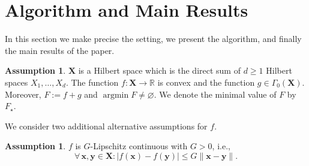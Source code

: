 \documentclass[11pt]{article}
\theoremstyle{plain}
\theoremstyle{definition}
\newtheorem{assumption}[theorem]{Assumption}
\theoremstyle{remark}
\newcommand{\norm}[1]{\lVert{#1}\rVert}
\newcommand{\abs}[1]{\lvert{#1}\rvert}
\DeclareMathOperator*{\argmin}{argmin}
\newcommand{\HH}{X}
\newcommand{\bHH}{\bm{X}}
\newcommand{\R}{\mathbb{R}}
\newcommand{\m}{d}
\newcommand{\bx}{\bm{x}}
\newcommand{\by}{\bm{y}}
\begin{document}
\section{Algorithm and Main Results}\label{2}

In this section we make precise the setting, we present the algorithm, and finally the main results of the paper.

\begin{assumption}\label{ass:0}
$\bHH$ is a Hilbert space which is the direct sum of $\m\geq 1$ Hilbert spaces $\HH_1, \dots, \HH_\m$.
The function $f\colon \bHH\to \R$ is convex and the function $g\in\Gamma_0(\bHH)$. Moreover, $F := f+g$ and $\argmin F\neq \varnothing$. We denote the minimal value of $F$ by $F_\star$.
\end{assumption}
\noindent
We consider two additional alternative assumptions for $f$.\\
\begin{assumption}\label{ass:1}
$f$ is $G$-Lipschitz continuous with $G>0$, i.e.,
\begin{equation*}
    \forall\,\bx,\by\in \bHH\colon \abs{f(\bx)-f(\by)}\leq G\norm{\bx-\by}.
\end{equation*}
\end{assumption}
\end{document}
